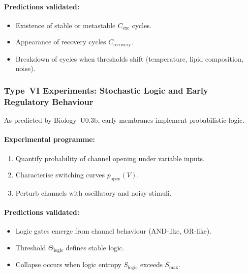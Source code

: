 \paragraph{Predictions validated:}

\begin{itemize}
    \item Existence of stable or metastable $C_{\mathrm{exc}}$ cycles.
    \item Appearance of recovery cycles $C_{\mathrm{recovery}}$.
    \item Breakdown of cycles when thresholds shift 
          (temperature, lipid composition, noise).
\end{itemize}



\subsubsection{Type~VI Experiments: Stochastic Logic and Early Regulatory Behaviour}

As predicted by Biology~U0.3b, early membranes implement probabilistic logic.

\paragraph{Experimental programme:}

\begin{enumerate}
    \item Quantify probability of channel opening under variable inputs.
    \item Characterise switching curves $p_{\mathrm{open}}(V)$.
    \item Perturb channels with oscillatory and noisy stimuli.
\end{enumerate}

\paragraph{Predictions validated:}

\begin{itemize}
    \item Logic gates emerge from channel behaviour (AND-like, OR-like).
    \item Threshold $\Theta_{\mathrm{logic}}$ defines stable logic.
    \item Collapse occurs when logic entropy $S_{\mathrm{logic}}$ 
          exceeds $S_{\max}$.
\end{itemize}



